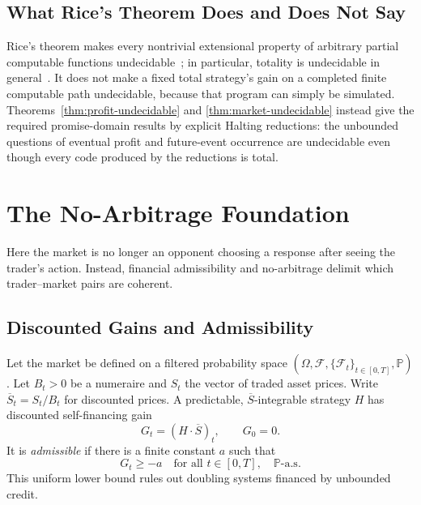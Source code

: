\documentclass[aps,pra,reprint,superscriptaddress,amsmath,amssymb,floatfix]{revtex4-2}
\theoremstyle{plain}
\theoremstyle{definition}
\theoremstyle{remark}
\begin{document}
\subsection{What Rice's Theorem Does and Does Not Say}

Rice's theorem makes every nontrivial extensional property of arbitrary partial
computable functions undecidable~\cite{Rice-1953}; in particular, totality is
undecidable in general~\cite{turing-36}. It does not make a fixed total
strategy's gain on a completed finite computable path undecidable, because that
program can simply be simulated. Theorems~\ref{thm:profit-undecidable} and
\ref{thm:market-undecidable} instead give the required promise-domain results
by explicit Halting reductions: the unbounded questions of eventual profit and
future-event occurrence are undecidable even though every code produced by the
reductions is total.

\section{The No-Arbitrage Foundation}
\label{sec:noarb}

Here the market is no longer an opponent choosing a response after seeing the
trader's action. Instead, financial admissibility and no-arbitrage delimit
which trader--market pairs are coherent.

\subsection{Discounted Gains and Admissibility}

Let the market be defined on a filtered probability space
\((\Omega,\mathcal{F},\{\mathcal{F}_t\}_{t\in[0,T]},\mathbb{P})\).
Let \(B_t>0\) be a numeraire and \(S_t\) the vector of traded asset prices.
Write \(\overline S_t=S_t/B_t\) for discounted prices. A predictable,
\(\overline S\)-integrable strategy \(H\) has discounted self-financing gain
\begin{equation}
  G_t=(H\mathbin{\cdot}\overline S)_t,\qquad G_0=0.
  \label{eq:gain}
\end{equation}
It is \emph{admissible} if there is a finite constant \(a\) such that
\begin{equation}
  G_t\geq -a\quad\text{for all }t\in[0,T],\quad\mathbb{P}\text{-a.s.}
  \label{eq:admissible}
\end{equation}
This uniform lower bound rules out doubling systems financed by unbounded
credit.
\end{document}
